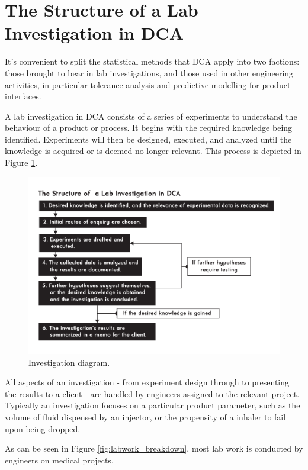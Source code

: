 \documentclass[11pt,a4paper,article]{memoir} %
\newlength\drop
\begin{document}
\section{The Structure of a Lab Investigation in DCA}
It's convenient to split the statistical methods that DCA apply into two factions: those brought to bear in lab investigations, and those used in other engineering activities, in particular tolerance analysis and predictive modelling for product interfaces.
\par
A lab investigation in DCA consists of a series of experiments to understand the behaviour of a product or process. It begins with the required knowledge being identified. Experiments will then be designed, executed, and analyzed until the knowledge is acquired or is deemed no longer relevant. This process is depicted in Figure \ref{fig:investigation_diagram}.
\begin{figure}[h!]
\centering
\includegraphics[width=1.2\textwidth]{Lab_Investigation_Diagram.pdf}
\caption{Investigation diagram.}
\label{fig:investigation_diagram}
\end{figure}
All aspects of an investigation - from experiment design through to presenting the results to a client - are handled by engineers assigned to the relevant project. Typically an investigation focuses on a particular product parameter, such as the volume of fluid dispensed by an injector, or the propensity of a inhaler to fail upon being dropped. 
\par
As can be seen in Figure \ref{fig:labwork_breakdown}, most lab work is conducted by engineers on medical projects.
\end{document}
